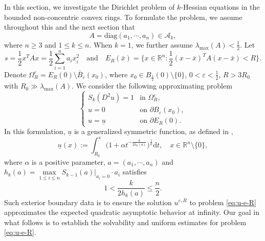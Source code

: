 \documentclass[reqno]{amsart}
\theoremstyle{remark}
\theoremstyle{definition}
\numberwithin{equation}{section}
\begin{document}
In this section, we investigate the Dirichlet problem of $k$-Hessian equations in the bounded non-concentric convex rings. To formulate the problem, we assume throughout this and the next section that 
$$A=\text{diag}(a_1,\cdots,a_n)\in\mathcal{A}_k,$$
where $n\geq3$ and $1\leq k\leq n$. When $k=1$, we further assume $\lambda_{\mathrm{max}}(A)<\frac{1}{2}$.
Let 
$$s=\frac{1}{2}x^TAx=\frac{1}{2}\sum_{i=1}^n a_ix_i^2\quad\text{and}\quad E_R(\bar{x})=\bigg\{x\in\mathbb{R}^n: \frac{1}{2}(x-\bar{x})^TA(x-\bar{x})<R\bigg\}.$$
Denote $\Omega_R^\varepsilon=E_R(0)\setminus\bar{B}_\varepsilon(x_0)$, where
$x_0\in B_{\frac{1}{2}}(0)\setminus\{0\}$, $0<\varepsilon<\frac{1}{2}$, $R>3R_0$ with $R_0\gg\lambda_{\text{max}}(A)$.
We consider the following approximating problem
\begin{equation}\label{eq:u-e-R}
	\begin{cases}
		S_k(D^2u)=1 & \text{in }\Omega_R^\varepsilon, \\
		u=0 & \text{on }\partial B_\varepsilon(x_0), \\
		u=\underline{u} & \text{on }\partial E_R(0).
	\end{cases}
\end{equation} 
In this formulation, $\underline{u}$ is a generalized symmetric function, as defined in \cite{Bao-Li-Li},
\begin{equation*}  
		\underline{u}(x):=\int_{R_0}^{s}\bigg(1+\alpha t^{-\frac{k}{2h_k(a)}}\bigg)^\frac{1}{k}\mathrm{d}t,\quad x\in\mathbb{R}^n\setminus\{0\},
\end{equation*}
where $\alpha$ is a positive parameter, $a=(a_1,\cdots,a_n)$ and $h_k(a)=\max\limits_{1\leq i\leq n}S_{k-1}(a)|_{a_i=0}\cdot a_i$ satisfies
\begin{equation}\label{eq:hk}
	1<\frac{k}{2h_k(a)}\leq \frac{n}{2}.
\end{equation}
Such exterior boundary data is to ensure the solution $u^{\varepsilon, R}$ to problem \eqref{eq:u-e-R} approximates the expected quadratic asymptotic behavior at infinity.  Our goal in what follows is to establish the solvability and uniform estimates for problem \eqref{eq:u-e-R}.
\end{document}
